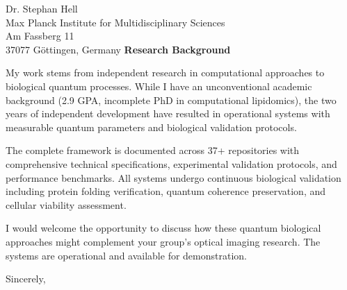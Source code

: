 \documentclass[11pt,a4paper]{letter}
\begin{document}
\begin{letter}{Dr. Stephan Hell\\Max Planck Institute for Multidisciplinary Sciences\\Am Fassberg 11\\37077 G\"ottingen, Germany}
\textbf{Research Background}

My work stems from independent research in computational approaches to biological quantum processes. While I have an unconventional academic background (2.9 GPA, incomplete PhD in computational lipidomics), the two years of independent development have resulted in operational systems with measurable quantum parameters and biological validation protocols.

The complete framework is documented across 37+ repositories with comprehensive technical specifications, experimental validation protocols, and performance benchmarks. All systems undergo continuous biological validation including protein folding verification, quantum coherence preservation, and cellular viability assessment.

I would welcome the opportunity to discuss how these quantum biological approaches might complement your group's optical imaging research. The systems are operational and available for demonstration.

\closing{Sincerely,}

\end{letter}
\end{document}
